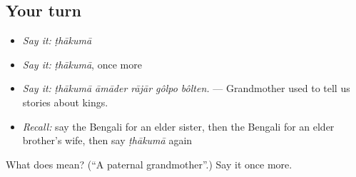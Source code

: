 \subsection*{Your turn}
\begin{itemize}
\raggedright
  \item \emph{Say it:} \emph{ṭhākumā}
  \item \emph{Say it:} \emph{ṭhākumā}, once more
  \item \emph{Say it:} \emph{ṭhākumā āmāder rājār gôlpo bôlten.} — Grandmother used to tell us stories about kings.
  \item \emph{Recall:} say the Bengali for an elder sister, then the Bengali for an elder brother's wife, then say \emph{ṭhākumā} again
\end{itemize}

\begin{tcolorbox}[breakable,colback=teal!4,colframe=teal!35!black,title={Before you move on}]
What does  mean? (\textquotedblleft{}A paternal grandmother\textquotedblright{}.) Say it once more.
\end{tcolorbox}
